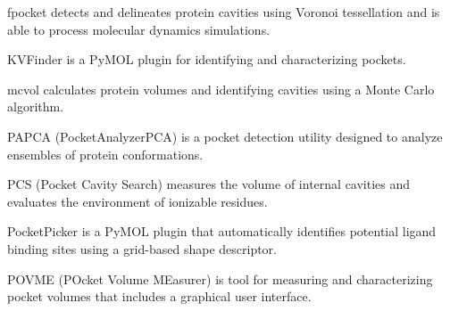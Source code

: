 fpocket  \cite{Schmidtke_2011} detects and delineates protein cavities using Voronoi tessellation and is able to process molecular dynamics simulations.

KVFinder \cite{Oliveira_2014} is a PyMOL plugin for identifying and characterizing pockets.

mcvol \cite{Till_2009} calculates protein volumes and identifying cavities using a Monte Carlo algorithm.

PAPCA (PocketAnalyzerPCA) is a pocket detection utility designed to analyze ensembles of protein conformations.

PCS (Pocket Cavity Search) measures the volume of internal cavities and evaluates the environment of ionizable residues.

PocketPicker \cite{Weisel_2007}  is a PyMOL plugin that automatically identifies potential ligand binding sites using a grid-based shape descriptor.

POVME (POcket Volume MEasurer) \cite{Durrant_2014} is tool for measuring and characterizing pocket volumes that includes a graphical user interface.


